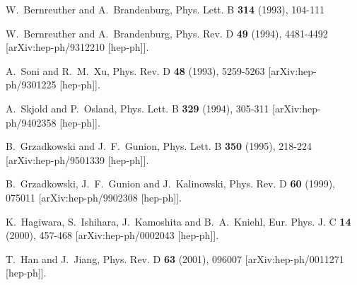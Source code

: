\documentclass[pdftex,twocolumn,epjc3]{svjour3}          %
\begin{document}
\begin{thebibliography}{9}
W.~Bernreuther and A.~Brandenburg,
Phys. Lett. B \textbf{314} (1993), 104-111

W.~Bernreuther and A.~Brandenburg,
Phys. Rev. D \textbf{49} (1994), 4481-4492
[arXiv:hep-ph/9312210 [hep-ph]].

A.~Soni and R.~M.~Xu,
Phys. Rev. D \textbf{48} (1993), 5259-5263
[arXiv:hep-ph/9301225 [hep-ph]].

A.~Skjold and P.~Osland,
Phys. Lett. B \textbf{329} (1994), 305-311
[arXiv:hep-ph/9402358 [hep-ph]].

B.~Grzadkowski and J.~F.~Gunion,
Phys. Lett. B \textbf{350} (1995), 218-224
[arXiv:hep-ph/9501339 [hep-ph]].

B.~Grzadkowski, J.~F.~Gunion and J.~Kalinowski,
Phys. Rev. D \textbf{60} (1999), 075011
[arXiv:hep-ph/9902308 [hep-ph]].

K.~Hagiwara, S.~Ishihara, J.~Kamoshita and B.~A.~Kniehl,
Eur. Phys. J. C \textbf{14} (2000), 457-468
[arXiv:hep-ph/0002043 [hep-ph]].

T.~Han and J.~Jiang,
Phys. Rev. D \textbf{63} (2001), 096007
[arXiv:hep-ph/0011271 [hep-ph]].


\end{thebibliography}
\end{document}
